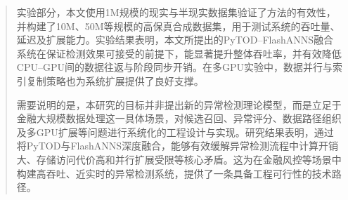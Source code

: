 \begin{abstract}
实验部分，本文使用1M规模的现实与半现实数据集验证了方法的有效性，并构建了10M、50M等规模的高保真合成数据集，用于测试系统的吞吐量、延迟及扩展能力\citep{ieee_cis_fraud,ibm_aml_data,dgraphfin_baseline}。实验结果表明，本文所提出的PyTOD--FlashANNS融合系统在保证检测效果可接受的前提下，能显著提升整体吞吐率，并有效降低CPU--GPU间的数据往返与阶段同步开销。在多GPU实验中，数据并行与索引复制策略也为系统扩展提供了良好支撑\citep{xiao2025flashanns,cuvs_multi_gpu_nn}。

需要说明的是，本研究的目标并非提出新的异常检测理论模型，而是立足于金融大规模数据处理这一具体场景，对候选召回、异常评分、数据路径组织及多GPU扩展等问题进行系统化的工程设计与实现。研究结果表明，通过将PyTOD与FlashANNS深度融合，能够有效缓解异常检测流程中计算开销大、存储访问代价高和并行扩展受限等核心矛盾。这为在金融风控等场景中构建高吞吐、近实时的异常检测系统，提供了一条具备工程可行性的技术路径\citep{zhao2022tod,xiao2025flashanns}。
\end{abstract}

